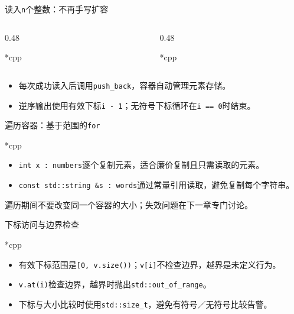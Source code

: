 \begin{frame}{读入\texttt{n}个整数：不再手写扩容}
\begin{columns}[T]
\begin{column}{0.48\textwidth}
\begin{Code}*{cpp}\end{Code}
\end{column}
\begin{column}{0.48\textwidth}
\begin{Code}*{cpp}\end{Code}
\end{column}
\end{columns}
\medskip
\begin{itemize}
\item 每次成功读入后调用\texttt{push\_back}，容器自动管理元素存储。
\item 逆序输出使用有效下标\texttt{i - 1}；无符号下标循环在\texttt{i == 0}时结束。
\end{itemize}
\end{frame}

\begin{frame}{遍历容器：基于范围的\texttt{for}}
\begin{Code}*{cpp}\end{Code}
\begin{itemize}
\item \texttt{int x : numbers}逐个复制元素，适合廉价复制且只需读取的元素。
\item \texttt{const std::string \&s : words}通过常量引用读取，避免复制每个字符串。
\end{itemize}
\medskip
\alert{遍历期间不要改变同一个容器的大小；失效问题在下一章专门讨论。}
\end{frame}

\begin{frame}{下标访问与边界检查}
\begin{Code}*{cpp}\end{Code}
\begin{itemize}
\item 有效下标范围是\texttt{[0, v.size())}；\texttt{v[i]}不检查边界，越界是未定义行为。
\item \texttt{v.at(i)}检查边界，越界时抛出\texttt{std::out\_of\_range}。
\item 下标与大小比较时使用\texttt{std::size\_t}，避免有符号／无符号比较告警。
\end{itemize}
\end{frame}

